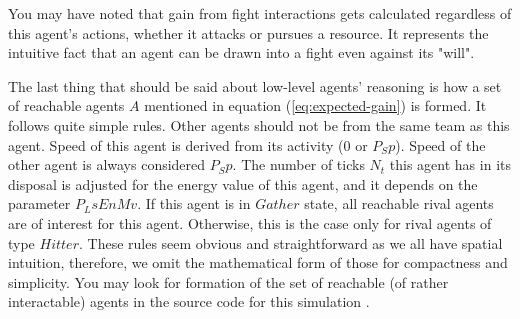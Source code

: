 You may have noted that gain from fight interactions gets calculated regardless of this agent's actions, whether it
attacks or pursues a resource. It represents the intuitive fact that an agent can be drawn into a fight even against its
"will".

The last thing that should be said about low-level agents' reasoning is how a set of reachable agents $A$ mentioned in
equation (\ref{eq:expected-gain}) is formed. It follows quite simple rules. Other agents should not be from the same
team as this agent. Speed of this agent is derived from its activity ($0$ or $P_Sp$). Speed of the other agent is always
considered $P_Sp$. The number of ticks $N_t$ this agent has in its disposal is adjusted for the energy value of this
agent, and it depends on the parameter $P_LsEnMv$. If this agent is in $Gather$ state, all reachable rival agents are of
interest for this agent. Otherwise, this is the case only for rival agents of type $Hitter$. These rules seem obvious
and straightforward as we all have spatial intuition, therefore, we omit the mathematical form of those for compactness
and simplicity. You may look for formation of the set of reachable (of rather interactable) agents in the source code
for this simulation \cite{github}.
